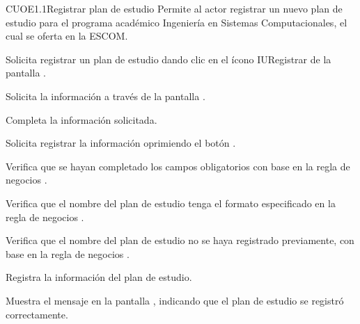 \begin{UseCase}{CUOE1.1}{Registrar plan de estudio}{	
	Permite al actor registrar un nuevo plan de estudio para el programa académico Ingeniería en Sistemas Computacionales, el cual se oferta en la ESCOM.
}
{	}	
\end{UseCase}

\begin{UCtrayectoria}
	\UCpaso [\UCactor] Solicita registrar un plan de estudio dando clic en el ícono IURegistrar de la pantalla . 
	
	\UCpaso[\UCsist] Solicita la información a través de la pantalla .
	
	\UCpaso [\UCactor] Completa la información solicitada. \label{CUOE1.1:CompletaInfo}
	
	\UCpaso [\UCactor] Solicita registrar la información oprimiendo el botón . 
	
	\UCpaso [\UCsist] Verifica que se hayan completado los campos obligatorios con base en la regla de negocios . 
	
	\UCpaso [\UCsist] Verifica que el nombre del plan de estudio tenga el formato especificado en la regla de negocios . 
	
	\UCpaso [\UCsist] Verifica que el nombre del plan de estudio no se haya registrado previamente, con base en la regla de negocios . 
			
	\UCpaso [\UCsist] Registra la información del plan de estudio.
	
	\UCpaso [\UCsist] Muestra el mensaje  en la pantalla , indicando que el plan de estudio se registró correctamente.	
	
\end{UCtrayectoria}

